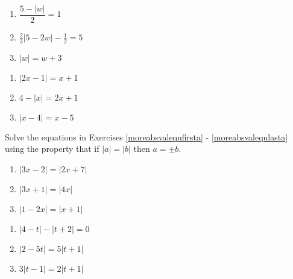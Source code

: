 \documentclass{ximera}
\begin{document}
\begin{multicols}{3}
\begin{enumerate}
\setcounter{enumi}{\value{HW}}

\item $\dfrac{5 - |w|}{2} = 1$
\item $\frac{2}{3} |5-2w| - \frac{1}{2} = 5$ 
\item $|w| = w + 3$ 

\setcounter{HW}{\value{enumi}}
\end{enumerate}
\end{multicols}


\begin{multicols}{3}
\begin{enumerate}
\setcounter{enumi}{\value{HW}}

\item  $|2x-1| = x+1$
\item  $4 - |x| = 2x+1$
\item  $|x-4| = x-5$ \label{solveabsvalequlasta}

\setcounter{HW}{\value{enumi}}
\end{enumerate}
\end{multicols}


Solve the equations in Exercises \ref{moreabsvalequfirsta} - \ref{moreabsvalequlasta} using  the property that if $|a| = |b|$ then  $a = \pm b$. 


\begin{multicols}{3}
\begin{enumerate}
\setcounter{enumi}{\value{HW}}

\item $|3x - 2| = |2x + 7|$  \label{moreabsvalequfirsta}
\item $|3x+1| = |4x|$
\item $|1-2x| = |x+1|$

\setcounter{HW}{\value{enumi}}
\end{enumerate}
\end{multicols}


\begin{multicols}{3}
\begin{enumerate}
\setcounter{enumi}{\value{HW}}

\item  $|4-t| - |t+2| = 0$
\item $|2-5t| = 5 |t+1|$
\item $3|t-1| = 2|t+1|$ \label{moreabsvalequlasta}


\setcounter{HW}{\value{enumi}}
\end{enumerate}
\end{multicols}
\end{document}

